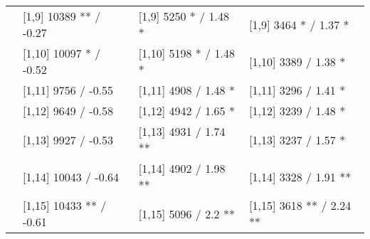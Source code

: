 \begin{table}
\begin{tabular}[t]{llll}
 & {}[1,9] 10389 ** / -0.27 & {}[1,9] 5250 * / 1.48 * & {}[1,9] 3464 * / 1.37 *\\
 & {}[1,10] 10097 * / -0.52 & {}[1,10] 5198 * / 1.48 * & {}[1,10] 3389  / 1.38 *\\
 & {}[1,11] 9756  / -0.55 & {}[1,11] 4908  / 1.48 * & {}[1,11] 3296  / 1.41 *\\
 & {}[1,12] 9649  / -0.58 & {}[1,12] 4942  / 1.65 * & {}[1,12] 3239  / 1.48 *\\
\addlinespace
 & {}[1,13] 9927  / -0.53 & {}[1,13] 4931  / 1.74 ** & {}[1,13] 3237  / 1.57 *\\
 & {}[1,14] 10043  / -0.64 & {}[1,14] 4902  / 1.98 ** & {}[1,14] 3328  / 1.91 **\\
 & {}[1,15] 10433 ** / -0.61 & {}[1,15] 5096  / 2.2 ** & {}[1,15] 3618 ** / 2.24 **\\
\bottomrule
\end{tabular}
\end{table}
